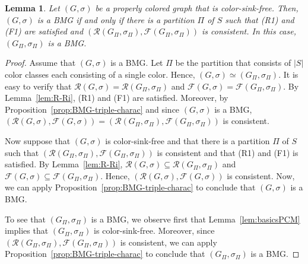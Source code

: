\documentclass[final,3p,times]{elsarticle}
\newtheorem{lemma}[theorem]{Lemma}%
\begin{document}
\begin{lemma}\label{BMG-R1F1}
    Let $(G,\sigma)$ be a properly colored graph that is color-sink-free. 
	Then, $(G,\sigma)$ is a BMG if and only if 
	there is a partition $\Pi$ of $S$ such that (R1) and (F1) are satisfied
	and $(\mathscr{R}(G_\Pi,\sigma_\Pi), \mathscr{F}(G_\Pi,\sigma_\Pi))$
	is consistent. In this case, $(G_\Pi,\sigma_\Pi)$ is a BMG. 
\end{lemma}
\begin{proof}
	Assume that $(G,\sigma)$ is a BMG. Let $\Pi$ be the partition that consists
	of $|S|$ color classes each consisting of a single color. Hence,
	$(G,\sigma)\simeq (G_\Pi,\sigma_\Pi)$. It is easy to verify that
	$\mathscr{R}(G,\sigma) = \mathscr{R}(G_\Pi,\sigma_\Pi)$ and
	$\mathscr{F}(G,\sigma) = \mathscr{F}(G_\Pi,\sigma_\Pi)$. By
	Lemma~\ref{lem:R-Ri}, (R1) and (F1) are satisfied. Moreover, by
	Proposition~\ref{prop:BMG-triple-charac} and since $(G,\sigma)$ is a BMG,
	$(\mathscr{R}(G,\sigma), \mathscr{F}(G,\sigma)) =
	(\mathscr{R}(G_\Pi,\sigma_\Pi), \mathscr{F}(G_\Pi,\sigma_\Pi))$ is
	consistent.
	
	Now suppose that $(G,\sigma)$ is color-sink-free and that there is a
	partition $\Pi$ of $S$ such that $(\mathscr{R}(G_\Pi,\sigma_\Pi),
	\mathscr{F}(G_\Pi,\sigma_\Pi))$ is consistent and that (R1) and (F1) is
	satisfied. By Lemma~\ref{lem:R-Ri}, $\mathscr{R}(G,\sigma) \subseteq
	\mathscr{R}(G_\Pi,\sigma_\Pi)$ and $\mathscr{F}(G,\sigma) \subseteq
	\mathscr{F}(G_\Pi,\sigma_\Pi)$. Hence, $(\mathscr{R}(G,\sigma)
	,\mathscr{F}(G,\sigma))$ is consistent. Now, we can apply
	Proposition~\ref{prop:BMG-triple-charac} to conclude that $(G,\sigma)$ is a
	BMG. 
	

	To see that $(G_\Pi,\sigma_\Pi)$ is a BMG, we observe first that
	Lemma~\ref{lem:basicsPCM} implies that $(G_\Pi,\sigma_\Pi)$ is
	color-sink-free. Moreover, since $(\mathscr{R}(G_\Pi,\sigma_\Pi),
	\mathscr{F}(G_\Pi,\sigma_\Pi))$ is consistent, we can apply
	Proposition~\ref{prop:BMG-triple-charac} to conclude that
	$(G_\Pi,\sigma_\Pi)$ is a BMG.
\end{proof}
\end{document}

